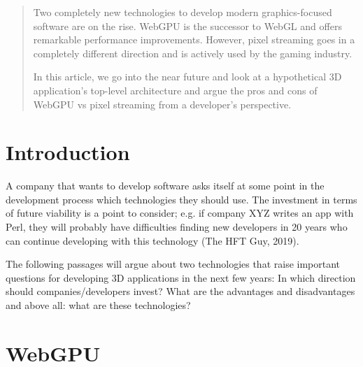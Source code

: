 \documentclass[10pt]{article}
\begin{document}
\begin{sloppypar}
  \begin{abstract}
    Two completely new technologies to develop modern graphics-focused software are on the rise. WebGPU is the successor to WebGL and offers remarkable performance improvements. However, pixel streaming goes in a completely different direction and is actively used by the gaming industry.

    In this article, we go into the near future and look at a hypothetical 3D application’s top-level architecture and argue the pros and cons of WebGPU vs pixel streaming from a developer’s perspective.
  \end{abstract}

  \pagebreak
  \tableofcontents
  \pagebreak
  \listoffigures
  \pagebreak
  \listoftables
  \pagebreak
  \lstlistoflistings
  \pagebreak


  \section{Introduction}
  \label{sec:introduction}

  A company that wants to develop software asks itself at some point in the development process which technologies they should use. The investment in terms of future viability is a point to consider; e.g. if company XYZ writes an app with Perl, they will probably have difficulties finding new developers in 20 years who can continue developing with this technology (The HFT Guy, 2019).

  The following passages will argue about two technologies that raise important questions for developing 3D applications in the next few years: In which direction should companies/developers invest? What are the advantages and disadvantages and above all: what are these technologies?

  \section{WebGPU}
  \label{sec:webgpu}


\end{sloppypar}
\end{document}
